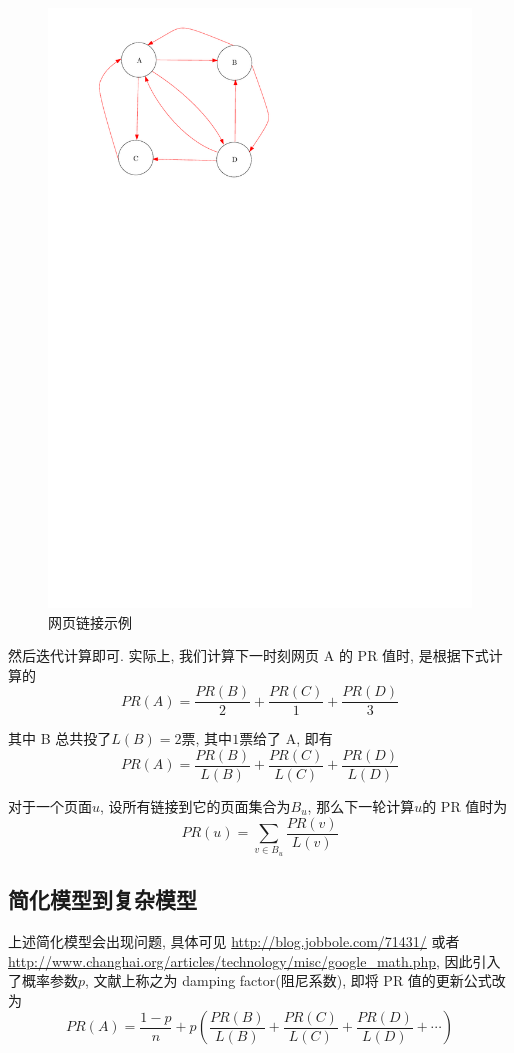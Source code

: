 \documentclass[a4paper,UTF8]{ctexart}
\theoremstyle{plain} \newtheorem{theorem}{定理}[section]
\theoremstyle{plain} \newtheorem{definition}{定义}[section]
\theoremstyle{plain} \newtheorem{lemma}{引理}[section]
\theoremstyle{plain} \newtheorem{proposition}{命题}[section]
\theoremstyle{plain} \newtheorem{example}{例}[section]
\theoremstyle{plain} \newtheorem{remark}{注}[section]
\theoremstyle{plain} \newtheorem{corollary}{推论}[section]
\begin{document}
\begin{figure}[!htb]
	\centering
	\includegraphics[width = 0.55 \textwidth]{simple.pdf}
	\caption{网页链接示例}
	\label{simple}
\end{figure}

然后迭代计算即可. 实际上, 我们计算下一时刻网页 A 的 PR 值时, 是根据下式计算的
\begin{equation*}
PR(A) = \frac{PR(B)}{2} + \frac{PR(C)}{1} + \frac{PR(D)}{3}
\end{equation*}

其中 B 总共投了$L(B) = 2$票, 其中$1$票给了 A, 即有
\begin{equation*}
PR(A) = \frac{PR(B)}{L(B)} + \frac{PR(C)}{L(C)} + \frac{PR(D)}{L(D)}
\end{equation*}

对于一个页面$u$, 设所有链接到它的页面集合为$B_{u}$, 那么下一轮计算$u$的 PR 值时为
\begin{equation*}
PR(u) = \sum_{v \in B_{u}} \frac{PR(v)}{L(v)}
\end{equation*}


\subsection{简化模型到复杂模型}
上述简化模型会出现问题, 具体可见 \url{http://blog.jobbole.com/71431/} 或者 \url{http://www.changhai.org/articles/technology/misc/google_math.php}, 因此引入了概率参数$p$, 文献上称之为 damping factor(阻尼系数), 即将 PR 值的更新公式改为
\begin{equation*}
PR(A) = \frac{1 - p}{n} + p \left( \frac{PR(B)}{L(B)} + \frac{PR(C)}{L(C)} + \frac{PR(D)}{L(D)} + \cdots \right)
\end{equation*}
\end{document}
